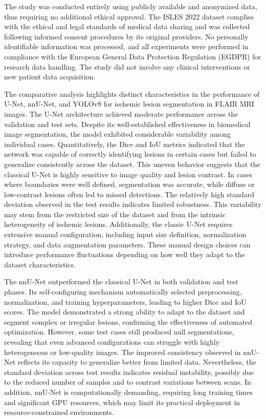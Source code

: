\documentclass[12pt]{article}
\begin{document}
The study was conducted entirely using publicly available and anonymized data, thus requiring no additional ethical approval. The ISLES 2022 dataset complies with the ethical and legal standards of medical data sharing and was collected following informed consent procedures by its original providers.
%
No personally identifiable information was processed, and all experiments were performed in compliance with the European General Data Protection Regulation (EGDPR) for research data handling. The study did not involve any clinical interventions or new patient data acquisition.

The comparative analysis highlights distinct characteristics in the performance of U-Net, nnU-Net, and YOLOv8 for ischemic lesion segmentation in FLAIR MRI images.
%
The U-Net architecture achieved moderate performance across the validation and test sets. Despite its well-established effectiveness in biomedical image segmentation, the model exhibited considerable variability among individual cases. Quantitatively, the Dice and IoU metrics indicated that the network was capable of correctly identifying lesions in certain cases but failed to generalize consistently across the dataset. This uneven behavior suggests that the classical U-Net is highly sensitive to image quality and lesion contrast. In cases where boundaries were well defined, segmentation was accurate, while diffuse or low-contrast lesions often led to missed detections.
%
The relatively high standard deviation observed in the test results indicates limited robustness. This variability may stem from the restricted size of the dataset and from the intrinsic heterogeneity of ischemic lesions. Additionally, the classic U-Net requires extensive manual configuration, including input size definition, normalization strategy, and data augmentation parameters. These manual design choices can introduce performance fluctuations depending on how well they adapt to the dataset characteristics.

The nnU-Net outperformed the classical U-Net in both validation and test phases. Its self-configuring mechanism automatically selected preprocessing, normalization, and training hyperparameters, leading to higher Dice and IoU scores. The model demonstrated a strong ability to adapt to the dataset and segment complex or irregular lesions, confirming the effectiveness of automated optimization. However, some test cases still produced null segmentations, revealing that even advanced configurations can struggle with highly heterogeneous or low-quality images.
%
The improved consistency observed in nnU-Net reflects its capacity to generalize better from limited data. Nevertheless, the standard deviation across test results indicates residual instability, possibly due to the reduced number of samples and to contrast variations between scans. In addition, nnU-Net is computationally demanding, requiring long training times and significant GPU resources, which may limit its practical deployment in resource-constrained environments.
\end{document}

